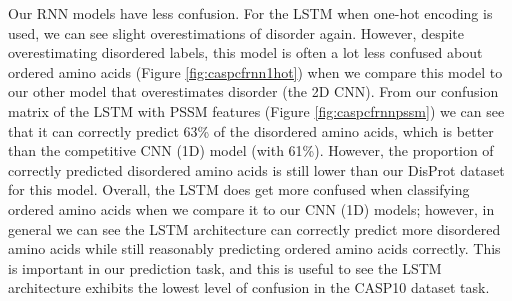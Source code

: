 \documentclass{l4proj}
\begin{document}
Our RNN models have less confusion. For the LSTM when one-hot encoding is used, we can see slight overestimations of disorder again. However, despite overestimating disordered labels, this model is often a lot less confused about ordered amino acids (Figure \ref{fig:caspcfrnn1hot}) when we compare this model to our other model that overestimates disorder (the 2D CNN). From our confusion matrix of the LSTM with PSSM features (Figure \ref {fig:caspcfrnnpssm}) we can see that it can correctly predict 63\% of the disordered amino acids, which is better than the competitive CNN (1D) model (with 61\%). However, the proportion of correctly predicted disordered amino acids is still lower than our DisProt dataset for this model. Overall, the LSTM does get more confused when classifying ordered amino acids when we compare it to our CNN (1D) models; however, in general we can see the LSTM architecture can correctly predict more disordered amino acids while still reasonably predicting ordered amino acids correctly. This is important in our prediction task, and this is useful to see the LSTM architecture exhibits the lowest level of confusion in the CASP10 dataset task.
\end{document}

